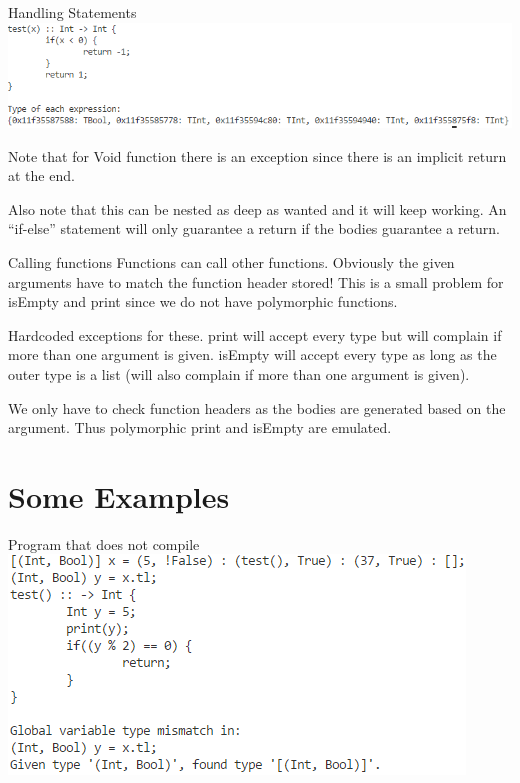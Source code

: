 \documentclass[10pt]{beamer}
\begin{document}
\begin{frame}{Handling Statements}
    \includegraphics[width=\textwidth]{presentation2/test3.png}

    Note that for Void function there is an exception since there is an implicit return at the end.

    Also note that this can be nested as deep as wanted and it will keep working. An ``if-else'' statement will only guarantee a return if the bodies guarantee a return.
\end{frame}

\begin{frame}{Calling functions}
    Functions can call other functions. Obviously the given arguments have to match the function header stored! This is a small problem for isEmpty and print since we do not have polymorphic functions.
    
    Hardcoded exceptions for these. print will accept every type but will complain if more than one argument is given. isEmpty will accept every type as long as the outer type is a list (will also complain if more than one argument is given).
    
    We only have to check function headers as the bodies are generated based on the argument. Thus polymorphic print and isEmpty are emulated.
\end{frame}

\section{Some Examples}
\begin{frame}{Program that does not compile}
    \includegraphics[width=\textwidth]{presentation2/test4.png}
\end{frame}
\end{document}
